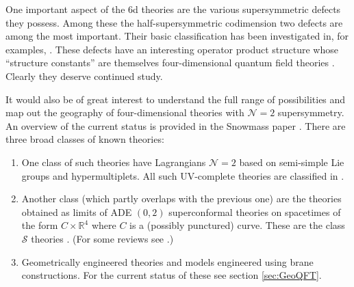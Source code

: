 \documentclass[12pt]{article}
\newcommand\BR{\mathbb{R}}
\newcommand\CalN{\mathcal{N}}
\newcommand\CalS{\mathcal{S}}
\begin{document}
One important aspect of the 6d theories are the various supersymmetric
defects they possess. Among these the half-supersymmetric codimension two defects are
among the most important. Their basic classification 
has been investigated in, for examples,
\cite{Balasubramanian:2018pbp,Balasubramanian:2020fwc,Chacaltana:2012zy}.
These defects have an interesting operator product structure whose ``structure constants'' are themselves four-dimensional quantum field theories  \cite{Gaiotto:2011xs}. Clearly they deserve continued study.




It would also be of great interest to understand the full range of possibilities
and map out the geography of four-dimensional theories with ${\CalN}=2$ supersymmetry. An overview of the current status is provided in the Snowmass paper \cite{Argyres:2022mnu}. 
There are three broad classes of known theories: 

\begin{enumerate} 

\item One class of such theories have 
Lagrangians ${\CalN}=2$ based on semi-simple Lie groups 
 and hypermultiplets. All such UV-complete theories 
are classified in \cite{Bhardwaj:2013qia}. 

\item Another class (which partly overlaps with the previous one) are the theories obtained as limits of ADE $(0,2)$ superconformal theories 
on spacetimes of the form $C \times {\BR}^{4}$ where $C$ is a (possibly punctured) curve. 
These are the class $\CalS$ theories  \cite{Gaiotto:2009we,Gaiotto:2009hg,Klemm:1996bj,Witten:1997sc}. (For some reviews see \cite{Tachikawa:2013kta,Akhond:2021xio,MooreKleinLectures}.) 

\item Geometrically engineered theories and models engineered using brane constructions. 
For the current status of these see section
\ref{sec:GeoQFT}. 


\end{enumerate} 
\end{document}
